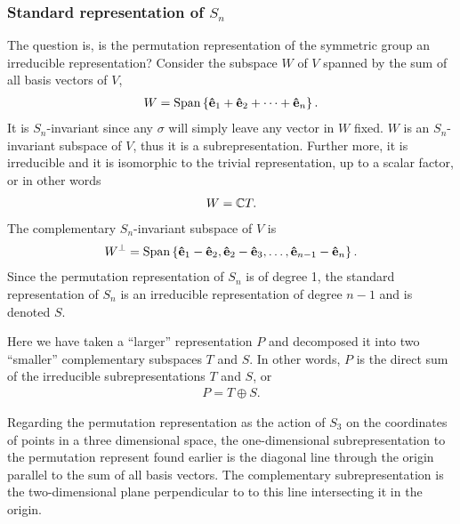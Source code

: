 	
\subsubsection{Standard representation of $S_n$}

	The question is, is the permutation representation of the symmetric group an irreducible representation? Consider the subspace $W$ of $V$ spanned by the sum of all basis vectors of $V$,
	\begin{align}
		W = \text{Span}\left\lbrace \mathbf{\hat{e}}_1 + \mathbf{\hat{e}}_2 + \dots + \mathbf{\hat{e}}_n \right\rbrace.
	\end{align}
	It is $S_n$-invariant since any $\sigma$ will simply leave any vector in $W$ fixed. $W$ is an $S_n$-invariant subspace of $V$, thus it is a subrepresentation. Further more, it is irreducible and it is isomorphic to the trivial representation, up to a scalar factor, or in other words
	\begin{align}
		W = \mathbb{C} T.
	\end{align}
	The complementary $S_n$-invariant subspace of $V$ is 
	\begin{align}
		W^\perp = \text{Span}\left\lbrace \mathbf{\hat{e}}_1 - \mathbf{\hat{e}}_2, \mathbf{\hat{e}}_2 - \mathbf{\hat{e}}_3, \dots, \mathbf{\hat{e}}_{n-1} - \mathbf{\hat{e}}_n \right\rbrace.
	\end{align}
	Since the permutation representation of $S_n$ is of degree 1, the standard representation of $S_n$ is an irreducible representation of degree $n-1$ and is denoted $S$. 
	
	Here we have taken a ``larger'' representation $P$ and decomposed it into two ``smaller'' complementary subspaces $T$ and $S$. In other words, $P$ is the direct sum of the irreducible subrepresentations $T$ and $S$, or
	\begin{align}
		P = T \oplus S.
	\end{align}
	
	\begin{example}
		Regarding the permutation representation as the action of $S_3$ on the coordinates of points in a three dimensional space, the one-dimensional subrepresentation to the permutation represent found earlier is the diagonal line through the origin parallel to the sum of all basis vectors. The complementary subrepresentation is the two-dimensional plane perpendicular to to this line intersecting it in the origin.
		
	\end{example}

